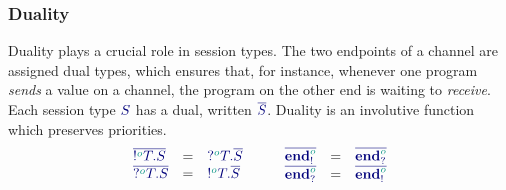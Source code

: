 \documentclass[main.tex]{subfiles}
\begin{document}
\subsubsection*{Duality}
Duality plays a crucial role in session types. The two endpoints of a channel are assigned dual types, which ensures that, for instance, whenever one program \emph{sends} a value on a channel, the program on the other end is waiting to \emph{receive}. Each session type $\ty{S}$ has a dual, written $\ty{\co{S}}$. Duality is an involutive function which preserves priorities.
\[
\begin{array}{lcl}
  \ty{\co{\tysend[\cs{o}]{T}{S}}} & = & \ty{\tyrecv[\cs{o}]{T}{\co{S}}} \\
  \ty{\co{\tyrecv[\cs{o}]{T}{S}}} & = & \ty{\tysend[\cs{o}]{T}{\co{S}}}
\end{array}
\qquad
\begin{array}{lcl}
  \ty{\co{\tyends[\cs{o}]}} & = & \ty{\co{\tyendr[\cs{o}]}} \\
  \ty{\co{\tyendr[\cs{o}]}} & = & \ty{\co{\tyends[\cs{o}]}}
\end{array}
\]
\end{document}
